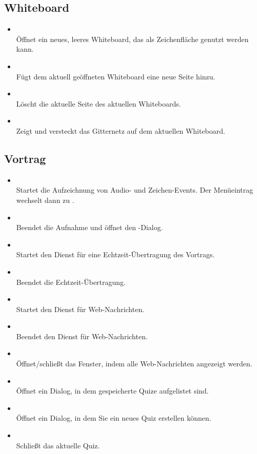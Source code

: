 \subsection{Whiteboard}
\begin{itemize}
\item {}\\Öffnet ein neues, leeres Whiteboard, das als Zeichenfläche genutzt werden kann.
\item {}\\Fügt dem aktuell geöffneten Whiteboard eine neue Seite hinzu.
\item {}\\Löscht die aktuelle Seite des aktuellen Whiteboards.
\item {}\\Zeigt und versteckt das Gitternetz auf dem aktuellen Whiteboard.
\end{itemize}
\subsection{Vortrag}
\begin{itemize}
\item {}\\Startet die Aufzeichnung von Audio- und Zeichen-Events. Der Menüeintrag wechselt dann zu .
\item {}\\Beendet die Aufnahme und öffnet den -Dialog.
\item {}\\ Startet den Dienst für eine Echtzeit-Übertragung des Vortrags.
\item {}\\ Beendet die Echtzeit-Übertragung.
\item {}\\ Startet den Dienst für Web-Nachrichten.
\item {}\\ Beendet den Dienst für Web-Nachrichten.
\item {}\\ Öffnet/schließt das Fenster, indem alle Web-Nachrichten angezeigt werden.
\item {}\\ Öffnet ein Dialog, in dem gespeicherte Quize aufgelistet sind.
\item {}\\ Öffnet ein Dialog, in dem Sie ein neues Quiz erstellen können.
\item {}\\ Schließt das aktuelle Quiz.
\end{itemize}
\vfill

